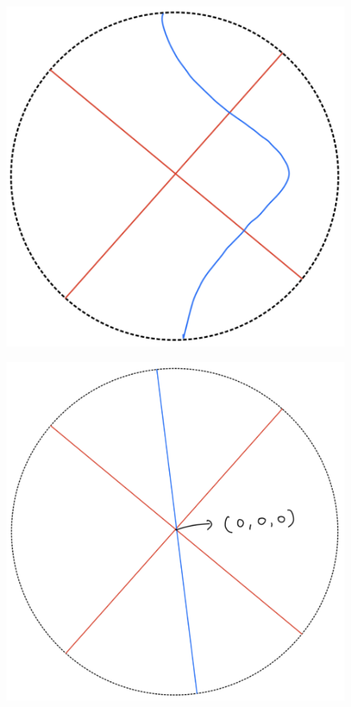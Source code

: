 \begin{definition}
\begin{enumerate}
\begin{itemize}
\begin{figure}[H]
    \centering
    \includegraphics[scale = 0.45]{diagrams/lemma4/16.png}
    \caption{}
    \label{fig:your-label}
\end{figure}
\begin{figure}[H]
    \centering
    \includegraphics[scale = 0.45]{diagrams/lemma4/17.png}

\end{figure}
\end{itemize}
\end{enumerate}
\end{definition}
